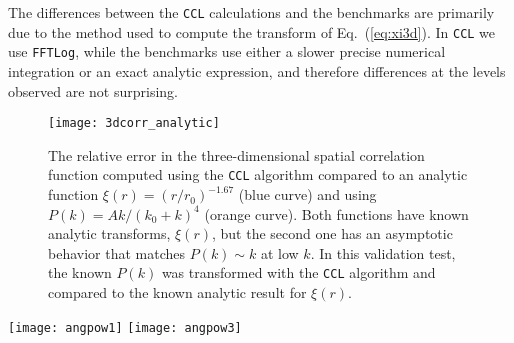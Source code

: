 \documentclass[\docopts]{\docclass}
\newcommand{\ccl}{{\tt CCL}\xspace}
\begin{document}
The differences between the \ccl calculations and the benchmarks are primarily due to the method used to compute the transform of Eq.~(\ref{eq:xi3d}). In \ccl we use {\tt FFTLog}, while the benchmarks use either a slower precise numerical integration or an exact analytic expression, and therefore differences at the levels observed are not surprising.

\begin{figure}[htbp]
\centering
\texttt{[image: 3dcorr\_analytic]}
\caption{The relative error in the three-dimensional spatial correlation function computed using the \ccl algorithm compared to an analytic function $\xi(r) = (r/r_0)^{-1.67}$ (blue curve) and using $P(k) = A k / (k_0 + k)^4$ (orange curve). Both functions have known analytic transforms, $\xi(r)$, but the second one has an asymptotic behavior that matches $P(k)\sim k$ at low $k$. In this validation test, the known $P(k)$ was transformed with the \ccl algorithm and compared to the known analytic result for $\xi(r)$.}
\label{fig:analytic_xi}
\end{figure}

\begin{figure*}[htbp]
\centering
\texttt{[image: angpow1]}
\texttt{[image: angpow3]}
\caption{Different predictions for the clustering angular power spectrum of a sample of galaxies with a Gaussian redshift distribution centered on $\langle z \rangle =1$. The left panel shows the $C_\ell$ predictions from the Limber case (green), the non-Limber case external to \ccl (yellow dot-dashed) and {\tt Angpow} (black). The right panel shows the fractional difference in the predicted clustering angular power spectrum between {\tt Angpow} and the extrernal brute-force non-Limber computation. The relative numerical difference between the non-Limber computations is lower than two orders of magnitude.}
\label{fig:angpow}
\end{figure*}
\end{document}

